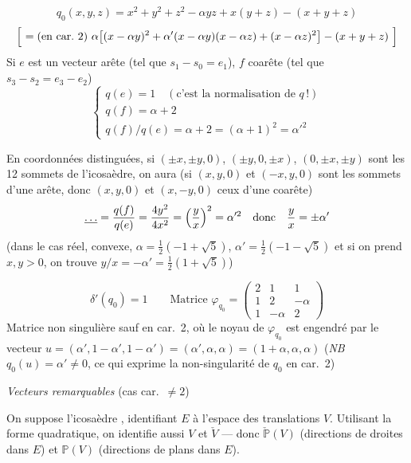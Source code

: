 \documentclass[11pt,a4paper]{article}
\begin{document}
\[
q_0(x,y,z) = x^2 + y^2 + z^2 - \alpha yz + x(y+z) - (x+y+z)
\]
\[
\Bigl[\ = (\text{en car.\ } 2)\ \alpha\bigl[(x - \alpha y)^2 + \alpha'(x-\alpha y)(x - \alpha z) + (x - \alpha z)^2\bigr] - (x+y+z)\ \Bigr]
\]
Si $e$ est un vecteur arête (tel que $s_1 - s_0 = e_1$), $f$  coarête (tel que $s_3 - s_2 = e_3 - e_2$)
\[
\begin{cases}
q(e) = 1 \quad (\text{c'est la normalisation de } q\,!) \\
q(f) = \alpha + 2 \\
q(f)/q(e) = \alpha + 2 = (\alpha+1)^2 = \alpha'^2
\end{cases}
\]

En coordonnées distinguées, si $(\pm x, \pm y, 0)$, $(\pm y, 0, \pm x)$, $(0, \pm x, \pm y)$ sont les 12 sommets de l'icosaèdre, on aura (si $(x,y,0)$ et $(-x,y,0)$ sont les sommets d'une arête, donc $(x,y,0)$ et $(x,-y,0)$ ceux d'une coarête)
\[
\struck{\ldots} = \frac{q(f)}{q(e)} = \frac{4y^2}{4x^2} = \Bigl(\frac{y}{x}\Bigr)^2 = \alpha'^2 \quad \text{donc} \quad \frac{y}{x} = \pm\alpha'
\]
(dans le cas réel,  convexe, $\alpha = \tfrac12(-1+\sqrt5)$, $\alpha' = \tfrac12(-1-\sqrt5)$ et si on prend $x, y > 0$, on trouve $y/x = -\alpha' = \tfrac12(1+\sqrt5)$)

\[
\delta'(q_0) = 1 \qquad \text{Matrice } \varphi_{q_0} = \begin{pmatrix} 2 & 1 & 1 \\ 1 & 2 & -\alpha \\ 1 & -\alpha & 2 \end{pmatrix}
\]
Matrice non singulière sauf en car.\ 2, où le noyau de $\varphi_{q_0}$ est engendré par le vecteur $u = (\alpha', 1-\alpha', 1-\alpha') = (\alpha', \alpha, \alpha) = (1+\alpha, \alpha, \alpha)$
(\emph{NB} $q_0(u) = \alpha' \neq 0$, ce qui exprime la non-singularité de $q_0$ en car.\ 2)

\emph{Vecteurs remarquables}  (cas car.\ $\neq 2$)

On suppose l'icosaèdre , identifiant $E$ à l'espace des translations $V$. Utilisant la forme quadratique, on identifie aussi $V$ et $\check V$ --- donc $\check{\mathbb{P}}(V)$ (directions de droites dans $E$) et $\mathbb{P}(V)$ (directions de plans dans $E$).
\end{document}
